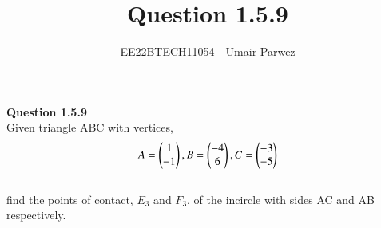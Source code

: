 \documentclass[journal,12pt,twocolumn]{IEEEtran}
\theoremstyle{remark}
\begin{document}



\vspace{3cm}

\title{
	Question 1.5.9
}

\author{
	EE22BTECH11054 - Umair Parwez
}	

\maketitle
\newpage
\bigskip

\renewcommand{\thefigure}{\theenumi}
\renewcommand{\thetable}{\theenumi}

\begin{flushleft}
	\textbf{Question 1.5.9}\\
	\bigskip
	Given triangle ABC with vertices, 
	\begin{align}
		A = \begin{pmatrix}1\\ -1\end{pmatrix}, B = \begin{pmatrix}-4\\ 6\end{pmatrix}, C = \begin{pmatrix}-3\\ -5\end{pmatrix}
	\end{align}\\
	find the points of contact, $E_{3}$ and $F_{3}$, of the incircle with sides AC and AB respectively.\\
	\bigskip
\end{flushleft}
\end{document}
